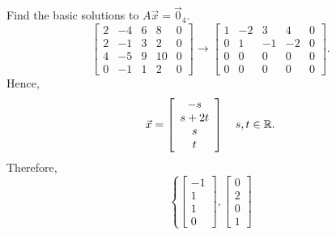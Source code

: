 \documentclass[pdf,9pt]{beamer}
\begin{document}
\begin{frame}[fragile]
\begin{solution}
    Find the basic solutions to $A\vec{x}=\vec{0}_4$.
    \[
      \left[\begin{array}{rrrr|r}
        2 & -4 & 6 & 8 & 0 \\
        2 & -1 & 3 & 2 & 0 \\
        4 & -5 & 9 & 10 & 0 \\
        0 & -1 & 1 & 2 & 0
      \end{array}\right]
      \rightarrow
      \left[\begin{array}{rrrr|r}
        1 & -2 & 3 & 4 & 0 \\
        0 & 1 & -1 & -2 & 0 \\
        0 & 0 & 0 & 0 & 0 \\
        0 & 0 & 0 & 0 & 0
      \end{array}\right].
    \]
    Hence,
    \begin{align*}
      \vec{x}=\left[\begin{array}{c} -s \\ s+2t \\ s \\ t \end{array}\right]\quad s,t\in\mathbb{R}.
    \end{align*}
    \pause
    Therefore,
    \vspace{-1em}
    \[
      \left\{
          \left[\begin{array}{r} -1 \\ 1 \\ 1 \\ 0 \end{array}\right],
          \left[\begin{array}{r} 0 \\ 2 \\ 0 \\ 1 \end{array}\right]
\]
\end{solution}
\end{frame}
\end{document}
